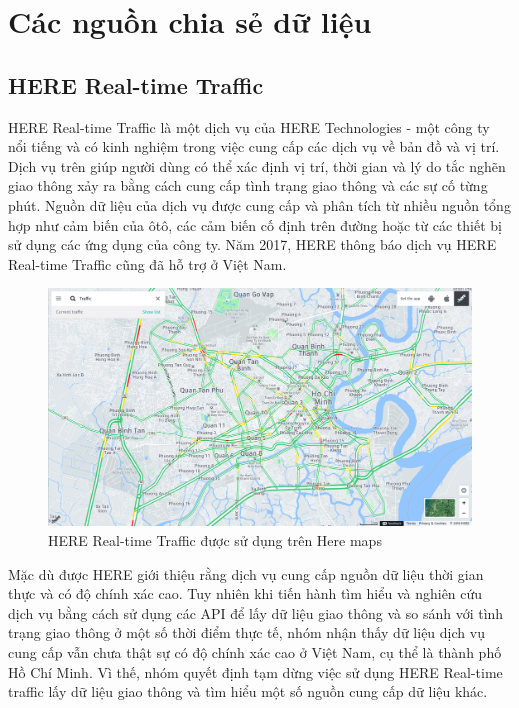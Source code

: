 
\chapter{Các nguồn chia sẻ dữ liệu} %

\label{Chapter3}

\section{HERE Real-time Traffic}
HERE Real-time Traffic là một dịch vụ của HERE Technologies - một công ty nổi tiếng và có kinh nghiệm trong việc cung cấp các dịch vụ về bản đồ và vị trí. Dịch vụ trên giúp người dùng có thể xác định vị trí, thời gian và lý do tắc nghẽn giao thông xảy ra bằng cách cung cấp tình trạng giao thông và các sự cố từng phút. Nguồn dữ liệu của dịch vụ được cung cấp và phân tích từ nhiều nguồn tổng hợp như cảm biến của ôtô, các cảm biến cố định trên đường hoặc từ các thiết bị sử dụng các ứng dụng của công ty. Năm 2017, HERE thông báo dịch vụ HERE Real-time Traffic cũng đã hỗ trợ ở Việt Nam.\cite{HERE}

\begin{figure}[!ht]
	\begin{center}
		\includegraphics[width=1.0\textwidth]{images/here_maps.png}
	\end{center}
	\caption{HERE Real-time Traffic được sử dụng trên Here maps}
\end{figure}

Mặc dù được HERE giới thiệu rằng dịch vụ cung cấp nguồn dữ liệu thời gian thực và có độ chính xác cao. Tuy nhiên khi tiến hành tìm hiểu và nghiên cứu dịch vụ bằng cách sử dụng các API để lấy dữ liệu giao thông và so sánh với tình trạng giao thông ở một số thời điểm thực tế, nhóm nhận thấy dữ liệu dịch vụ cung cấp vẫn chưa thật sự có độ chính xác cao ở Việt Nam, cụ thể là thành phố Hồ Chí Minh. Vì thế, nhóm quyết định tạm dừng việc sử dụng HERE Real-time traffic lấy dữ liệu giao thông và tìm hiểu một số nguồn cung cấp dữ liệu khác.
